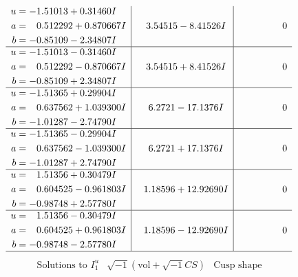 \documentclass[1p]{elsarticle_modified}
\theoremstyle{definition}
\newcommand{\I}{\sqrt{-1}}
\begin{document}
$$\begin{array}{c|c|c}
\begin{aligned}
u &= -1.51013 + 0.31460 I \\
a &= \phantom{-}0.512292 + 0.870667 I \\
b &= -0.85109 - 2.34807 I\end{aligned}
 & \phantom{-}3.54515 - 8.41526 I & \phantom{-0.000000 } 0 \\ \hline\begin{aligned}
u &= -1.51013 - 0.31460 I \\
a &= \phantom{-}0.512292 - 0.870667 I \\
b &= -0.85109 + 2.34807 I\end{aligned}
 & \phantom{-}3.54515 + 8.41526 I & \phantom{-0.000000 } 0 \\ \hline\begin{aligned}
u &= -1.51365 + 0.29904 I \\
a &= \phantom{-}0.637562 + 1.039300 I \\
b &= -1.01287 - 2.74790 I\end{aligned}
 & \phantom{-}6.2721 - 17.1376 I & \phantom{-0.000000 } 0 \\ \hline\begin{aligned}
u &= -1.51365 - 0.29904 I \\
a &= \phantom{-}0.637562 - 1.039300 I \\
b &= -1.01287 + 2.74790 I\end{aligned}
 & \phantom{-}6.2721 + 17.1376 I & \phantom{-0.000000 } 0 \\ \hline\begin{aligned}
u &= \phantom{-}1.51356 + 0.30479 I \\
a &= \phantom{-}0.604525 - 0.961803 I \\
b &= -0.98748 + 2.57780 I\end{aligned}
 & \phantom{-}1.18596 + 12.92690 I & \phantom{-0.000000 } 0 \\ \hline\begin{aligned}
u &= \phantom{-}1.51356 - 0.30479 I \\
a &= \phantom{-}0.604525 + 0.961803 I \\
b &= -0.98748 - 2.57780 I\end{aligned}
 & \phantom{-}1.18596 - 12.92690 I & \phantom{-0.000000 } 0\\
 \hline 
 \end{array}$$\newpage$$\begin{array}{c|c|c}  
\text{Solutions to }I^u_{1}& \I (\text{vol} + \sqrt{-1}CS) & \text{Cusp shape}\\
 \hline 
\begin{aligned}

\end{aligned}
\end{array}$$
\end{document}
